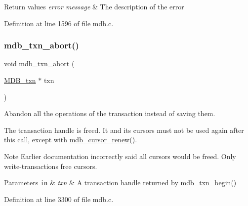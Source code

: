 \begin{DoxyRetVals}{Return values}
{\em error message} & The description of the error \\
\hline
\end{DoxyRetVals}


Definition at line 1596 of file mdb.\+c.

\mbox{\label{group__internal_ga73a5938ae4c3239ee11efa07eb22b882}} 
\subsubsection{\texorpdfstring{mdb\+\_\+txn\+\_\+abort()}{mdb\_txn\_abort()}}
{\footnotesize\ttfamily void mdb\+\_\+txn\+\_\+abort (\begin{DoxyParamCaption}\item[{\mbox{\hyperlink{struct_m_d_b__txn}{M\+D\+B\+\_\+txn}} $\ast$}]{txn }\end{DoxyParamCaption})}



Abandon all the operations of the transaction instead of saving them. 

The transaction handle is freed. It and its cursors must not be used again after this call, except with \mbox{\hyperlink{group__mdb_gac8b57befb68793070c85ea813df481af}{mdb\+\_\+cursor\+\_\+renew()}}. \begin{DoxyNote}{Note}
Earlier documentation incorrectly said all cursors would be freed. Only write-\/transactions free cursors. 
\end{DoxyNote}

\begin{DoxyParams}[1]{Parameters}
\mbox{\tt in}  & {\em txn} & A transaction handle returned by \mbox{\hyperlink{group__mdb_gad7ea55da06b77513609efebd44b26920}{mdb\+\_\+txn\+\_\+begin()}} \\
\hline
\end{DoxyParams}


Definition at line 3300 of file mdb.\+c.

\mbox{\label{group__internal_gaec09fc4062fc4d99882f7f7256570bdb}} 
